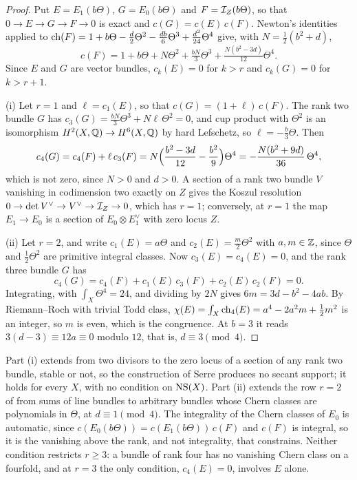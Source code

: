 \begin{proof}
Put $E=E_{1}(b\Theta)$, $G=E_{0}(b\Theta)$ and $F=\mathcal{I}_{Z}(b\Theta)$, so that
$0\to E\to G\to F\to0$ is exact and $c(G)=c(E)\,c(F)$. Newton's identities
applied to $\operatorname{ch}(F)=1+b\Theta-\frac d2\Theta^{2}-\frac{db}{6}\Theta^{3}
+\frac{d^{2}}{24}\Theta^{4}$ give, with $N=\frac12(b^{2}+d)$,
\[
  c(F)=1+b\Theta+N\Theta^{2}+\tfrac{bN}{3}\Theta^{3}
  +\tfrac{N(b^{2}-3d)}{12}\Theta^{4}.
\]
Since $E$ and $G$ are vector bundles, $c_{k}(E)=0$ for $k>r$ and
$c_{k}(G)=0$ for $k>r+1$.

(i) Let $r=1$ and $\ell=c_{1}(E)$, so that $c(G)=(1+\ell)\,c(F)$. The rank
two bundle $G$ has $c_{3}(G)=\frac{bN}{3}\Theta^{3}+N\ell\,\Theta^{2}=0$, and
cup product with $\Theta^{2}$ is an isomorphism $H^{2}(X,\mathbb{Q})\to H^{6}(X,\mathbb{Q})$
by hard Lefschetz, so $\ell=-\frac b3\Theta$. Then
\[
  c_{4}(G)=c_{4}(F)+\ell\,c_{3}(F)
  =N\Bigl(\frac{b^{2}-3d}{12}-\frac{b^{2}}{9}\Bigr)\Theta^{4}
  =-\frac{N(b^{2}+9d)}{36}\,\Theta^{4},
\]
which is not zero, since $N>0$ and $d>0$. A section of a rank two bundle $V$
vanishing in codimension two exactly on $Z$ gives the Koszul resolution
$0\to\det V^{\vee}\to V^{\vee}\to\mathcal{I}_{Z}\to0$, which has $r=1$; conversely,
at $r=1$ the map $E_{1}\to E_{0}$ is a section of $E_{0}\otimes E_{1}^{\vee}$
with zero locus $Z$.

(ii) Let $r=2$, and write $c_{1}(E)=a\Theta$ and $c_{2}(E)=\frac m2\Theta^{2}$
with $a,m\in\mathbb{Z}$, since $\Theta$ and $\frac12\Theta^{2}$ are primitive
integral classes. Now $c_{3}(E)=c_{4}(E)=0$, and the rank three bundle $G$
has
\[
  c_{4}(G)=c_{4}(F)+c_{1}(E)\,c_{3}(F)+c_{2}(E)\,c_{2}(F)=0 .
\]
Integrating, with $\int_{X}\Theta^{4}=24$, and dividing by $2N$ gives
$6m=3d-b^{2}-4ab$. By Riemann--Roch with trivial Todd class,
$\chi(E)=\int_{X}\operatorname{ch}_{4}(E)=a^{4}-2a^{2}m+\frac12m^{2}$ is an integer, so $m$
is even, which is the congruence. At $b=3$ it reads $3(d-3)\equiv12a\equiv0$
modulo $12$, that is, $d\equiv3\pmod4$.
\end{proof}

\begin{remark}\label{rem:lowrankburch}
Part (i) extends  from two divisors to the zero locus of a
section of any rank two bundle, stable or not, so the construction of Serre
produces no secant support; it holds for every $X$, with no condition on
$\mathrm{NS}(X)$. Part (ii) extends the row $r=2$ of  from sums of
line bundles to arbitrary bundles whose Chern classes are polynomials in
$\Theta$, at $d\equiv1\pmod4$. The integrality of
the Chern classes of $E_{0}$ is automatic, since
$c(E_{0}(b\Theta))=c(E_{1}(b\Theta))\,c(F)$ and $c(F)$ is integral, so it is
the vanishing above the rank, and not integrality, that constrains. Neither
condition restricts $r\ge3$: a bundle of rank four has no vanishing Chern
class on a fourfold, and at $r=3$ the only condition, $c_{4}(E)=0$, involves
$E$ alone.
\end{remark}

